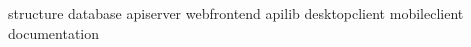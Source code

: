 
\graphicspath{{./src/code/generated/}} 

{structure}
\newpage
{database}
\newpage
{apiserver}
\newpage
{webfrontend}
\newpage
{apilib}
\newpage
{desktopclient}
\newpage
{mobileclient}
\newpage
{documentation}

